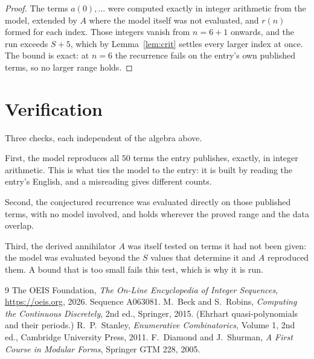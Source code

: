 \documentclass[11pt,a4paper]{article}
\theoremstyle{plain}
\theoremstyle{definition}
\begin{document}
\begin{proof}
The terms $a(0),\dots$ were computed exactly in integer arithmetic from the model, extended by
$A$ where the model itself was not evaluated, and $r(n)$ formed for each index. Those integers
vanish from $n=6+1$ onwards, and the run exceeds $S+5$, which by
Lemma~\ref{lem:crit} settles every larger index at once. The bound is exact: at $n=6$ the recurrence fails on the entry's own published terms, so no larger range holds.
\end{proof}

\section{Verification}

Three checks, each independent of the algebra above.

First, the model reproduces all $50$ terms the entry publishes, exactly, in integer
arithmetic. This is what ties the model to the entry: it is built by reading the entry's
English, and a misreading gives different counts.

Second, the conjectured recurrence was evaluated directly on those published terms, with no
model involved, and holds wherever the proved range and the data overlap.

Third, the derived annihilator $A$ was itself tested on terms it had not been given: the model
was evaluated beyond the $S$ values that determine it and $A$ reproduced them. A bound that is
too small fails this test, which is why it is run.

\begin{thebibliography}{9}
 The OEIS Foundation, \emph{The On-Line Encyclopedia of Integer
Sequences}, \url{https://oeis.org}, 2026. Sequence A063081.
 M.~Beck and S.~Robins, \emph{Computing the Continuous Discretely},
2nd ed., Springer, 2015. (Ehrhart quasi-polynomials and their periods.)
 R.~P.~Stanley, \emph{Enumerative Combinatorics}, Volume 1, 2nd ed.,
Cambridge University Press, 2011.
 F.~Diamond and J.~Shurman, \emph{A First Course in Modular Forms},
Springer GTM 228, 2005.
\end{thebibliography}
\end{document}
